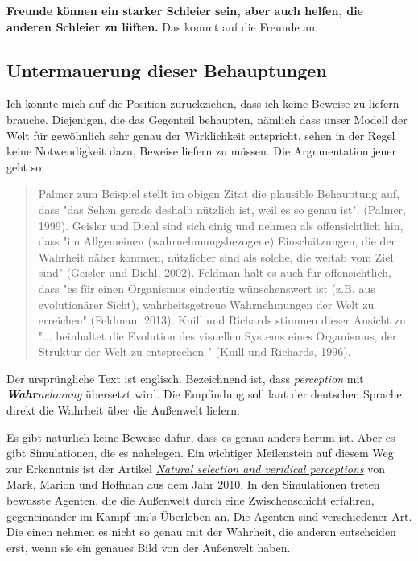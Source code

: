 \documentclass[12pt]{book}
\begin{document}
\textbf{Freunde können ein starker Schleier sein, aber auch helfen, die anderen Schleier zu lüften.} Das kommt auf die Freunde an.

\subsection{Untermauerung dieser Behauptungen}

Ich könnte mich auf die Position zurückziehen, dass ich keine Beweise zu liefern brauche. Diejenigen, die das Gegenteil behaupten, nämlich dass unser Modell der Welt für gewöhnlich sehr genau der Wirklichkeit entspricht, sehen in der Regel keine Notwendigkeit dazu, Beweise liefern zu müssen. Die Argumentation jener geht so:


\begin{quote}\begin{tcolorbox}
Palmer zum Beispiel stellt im obigen Zitat die plausible Behauptung auf, dass "das Sehen gerade deshalb nützlich ist, weil es so genau ist". (Palmer, 1999). Geisler und Diehl sind sich einig und nehmen als offensichtlich hin, dass "im Allgemeinen (wahrnehmungsbezogene) Einschätzungen, die der Wahrheit näher kommen, nützlicher sind als solche, die weitab vom Ziel sind" (Geisler und Diehl, 2002). Feldman hält es auch für offensichtlich, dass "es für einen Organismus eindeutig wünschenswert ist (z.B. aus evolutionärer Sicht), wahrheitsgetreue Wahrnehmungen der Welt zu erreichen" (Feldman, 2013). Knill und Richards stimmen dieser Ansicht zu "... beinhaltet die Evolution des visuellen Systems eines Organismus, der Struktur der Welt zu entsprechen " (Knill und Richards, 1996).
\end{tcolorbox}\end{quote}

Der ursprüngliche Text ist englisch. Bezeichnend ist, dass \emph{perception} mit \emph{\textbf{Wahr}nehmung} übersetzt wird. Die Empfindung soll laut der deutschen Sprache direkt die Wahrheit über die Außenwelt liefern.

Es gibt natürlich keine Beweise dafür, dass es genau anders herum ist. Aber es gibt Simulationen, die es nahelegen. Ein wichtiger Meilenstein auf diesem Weg zur Erkenntnis ist der Artikel \href{http://cogsci.uci.edu/~ddhoff/PerceptualEvolution.pdf}{\emph{Natural selection and veridical perceptions}} von Mark, Marion und Hoffman aus dem Jahr 2010. In den Simulationen treten bewusste Agenten, die die Außenwelt durch eine Zwischenschicht erfahren, gegeneinander im Kampf um's Überleben an. Die Agenten sind verschiedener Art. Die einen nehmen es nicht so genau mit der Wahrheit, die anderen entscheiden erst, wenn sie ein genaues Bild von der Außenwelt haben.
\end{document}
